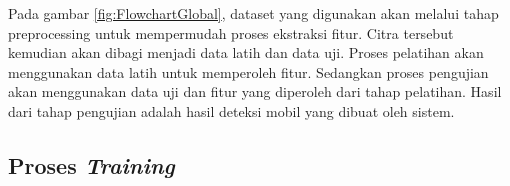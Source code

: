 Pada gambar \ref{fig:FlowchartGlobal}, dataset yang digunakan akan melalui tahap preprocessing untuk mempermudah proses ekstraksi fitur. Citra tersebut kemudian akan dibagi menjadi data latih dan data uji. Proses pelatihan akan menggunakan data latih untuk memperoleh fitur. Sedangkan proses pengujian akan menggunakan data uji dan fitur yang diperoleh dari tahap pelatihan. Hasil dari tahap pengujian adalah hasil deteksi mobil yang dibuat oleh sistem.
\\

\subsection{Proses \textit{Training}}

\begin{adjustbox}{width=1\textwidth}
	\begin{minipage}{\linewidth}
		\label{fig:FlowchartTraining}
	\end{minipage}
\end{adjustbox}

